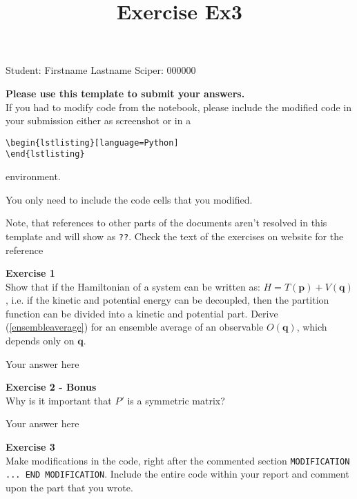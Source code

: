 \documentclass{article}
\title{Exercise Ex3}
\begin{document}
\maketitle\maketitle

Student:  Firstname Lastname    Sciper: 000000

\begin{mdframed}
\textbf{Please use this template to submit your answers.}\\
If you had to modify code from the notebook, please include the modified code in your submission either as screenshot or in a

\begin{verbatim}
\begin{lstlisting}[language=Python]
\end{lstlisting}
\end{verbatim}

environment.

You only need to include the code cells that you modified.

Note, that references to other parts of the documents aren't resolved in this template and will show as \texttt{??}. Check the text of the exercises on website for the reference
\end{mdframed}

\begin{mdframed}
\textbf{Exercise 1}\\
Show that if the Hamiltonian of a system can be written as: $H = T(\mathbf{p}) + V(\mathbf{q})$,
i.e. if the kinetic and potential energy can be decoupled, then the partition function can be divided into a kinetic and potential part. Derive (\ref{ensembleaverage}) for an ensemble average of an observable $O(\mathbf{q})$, which depends only on $\mathbf{q}$.
\end{mdframed}

Your answer here

\begin{mdframed}
\textbf{Exercise 2 - Bonus}\\
Why is it important that $P'$ is a symmetric matrix?
\end{mdframed}

Your answer here

\begin{mdframed}
\textbf{Exercise 3}\\
Make modifications in the code, right after the commented section \texttt{MODIFICATION ... END MODIFICATION}. Include the entire code within your report and comment upon the part that you wrote.
\end{mdframed}
\end{document}
